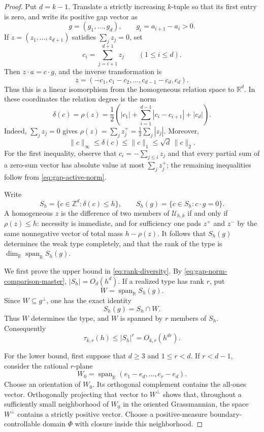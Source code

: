 \documentclass[11pt,reqno]{amsart}
\theoremstyle{definition}
\theoremstyle{remark}
\begin{document}
\begin{proof}
Put $d=k-1$. Translate a strictly increasing $k$-tuple so that its first
entry is zero, and write its positive gap vector as
\[
 g=(g_1,\ldots,g_d),\qquad g_i=a_{i+1}-a_i>0.
\]
If $z=(z_1,\ldots,z_{d+1})$ satisfies $\sum_jz_j=0$, set
\[
 c_i=\sum_{j=i+1}^{d+1}z_j\qquad(1\leq i\leq d).
\]
Then $z\cdot a=c\cdot g$, and the inverse transformation is
\begin{equation}\label{eq:gap-tail-map}
 z=(-c_1,c_1-c_2,\ldots,c_{d-1}-c_d,c_d).
\end{equation}
Thus this is a linear isomorphism from the homogeneous relation space to
$\mathbb R^d$. In these coordinates the relation degree is the norm
\begin{equation}\label{eq:gap-active-norm}
 \delta(c)
 =\rho(z)
 =\frac12\left(
 |c_1|+\sum_{i=1}^{d-1}|c_i-c_{i+1}|+|c_d|\right).
\end{equation}
Indeed, $\sum_jz_j=0$ gives
$\rho(z)=\sum_jz_j^+=\frac12\sum_j|z_j|$. Moreover,
\begin{equation}\label{eq:gap-norm-comparison-master}
 \|c\|_\infty\leq\delta(c)
 \leq\|c\|_1\leq\sqrt d\,\|c\|_2.
\end{equation}
For the first inequality, observe that
$c_i=-\sum_{j\leq i}z_j$ and that every partial sum of a zero-sum vector
has absolute value at most $\sum_jz_j^+$; the remaining inequalities
follow from \eqref{eq:gap-active-norm}.

Write
\[
 S_h=\{c\in\mathbb Z^d:\delta(c)\leq h\},\qquad
 S_h(g)=\{c\in S_h:c\cdot g=0\}.
\]
A homogeneous $z$ is the difference of two members of
$\mathcal U_{h,k}$ if and only if $\rho(z)\leq h$: necessity is immediate,
and for sufficiency one pads $z^+$ and $z^-$ by the same nonnegative vector
of total mass $h-\rho(z)$. It follows that $S_h(g)$ determines the weak
type completely, and that the rank of the type is
$\dim_{\mathbb R}\operatorname{span}_{\mathbb R}S_h(g)$.

We first prove the upper bound in \eqref{eq:rank-diversity}.
By \eqref{eq:gap-norm-comparison-master}, $|S_h|=O_d(h^d)$. If a realized
type has rank $r$, put
\[
 W=\operatorname{span}_{\mathbb R}S_h(g).
\]
Since $W\subseteq g^\perp$, one has the exact identity
\[
 S_h(g)=S_h\cap W.
\]
Thus $W$ determines the type, and $W$ is spanned by $r$ members of $S_h$.
Consequently
\[
 \tau_{k,r}(h)\leq |S_h|^r=O_{k,r}(h^{dr}).
\]

For the lower bound, first suppose that $d\geq3$ and $1\leq r<d$.
If $r<d-1$, consider the rational $r$-plane
\[
 W_0=\operatorname{span}_{\mathbb R}
       (e_1-e_d,\ldots,e_r-e_d).
\]
Choose an orientation of $W_0$.  Its orthogonal complement contains the
all-ones vector. Orthogonally
projecting that vector to $W^\perp$ shows that, throughout a sufficiently
small neighborhood of $W_0$ in the oriented Grassmannian, the space $W^\perp$
contains a strictly positive vector. Choose a positive-measure
boundary-controllable domain $\Phi$ with closure inside this neighborhood.


\end{proof}
\end{document}

